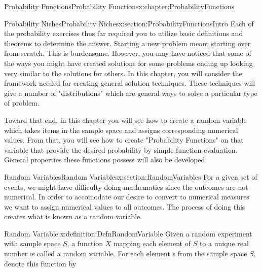 \documentclass[oneside,10pt,]{book}
\numberwithin{equation}{section}
\begin{document}
%
%
\typeout{************************************************}
\typeout{************************************************}
%
\begin{chapterptx}{Probability Functions}{}{Probability Functions}{}{}{x:chapter:ProbabilityFunctions}
%
%
\typeout{************************************************}
\typeout{************************************************}
%
\begin{sectionptx}{Probability Niches}{}{Probability Niches}{}{}{x:section:ProbabilityFunctionsIntro}
Each of the probability exercises thus far required you to utilize basic definitions and theorems to determine the answer. Starting a new problem meant starting over from scratch. This is burdensome.  However, you may have noticed that some of the ways you might have created solutions for some problems ending up looking very similar to the solutions for others. In this chapter, you will consider the framework needed for creating general solution techniques. These techniques will give a number of "distributions" which are general ways to solve a particular type of problem.%
\par
Toward that end, in this chapter you will see how to create a random variable which takes items in the sample space and assigns corresponding numerical values. From that, you will see how to create "Probability Functions" on that variable that provide the desired probability by simple function evaluation. General properties these functions possess will also be developed.%
\end{sectionptx}
%
%
\typeout{************************************************}
\typeout{************************************************}
%
\begin{sectionptx}{Random Variables}{}{Random Variables}{}{}{x:section:RandomVariables}
For a given set of events, we might have difficulty doing mathematics since the outcomes are not numerical. In order to accomodate our desire to convert to numerical measures we want to assign numerical values to all outcomes. The process of doing this creates what is known as a random variable.%
\par
\begin{definition}{Random Variable.}{x:definition:DefnRandomVariable}%
Given a random experiment with sample space \(S\), a function \(X\) mapping each element of \(S\) to a unique real number is called a random variable. For each element s from the sample space \(S\), denote this function by%

\end{definition}
\end{sectionptx}
\end{chapterptx}
\end{document}

